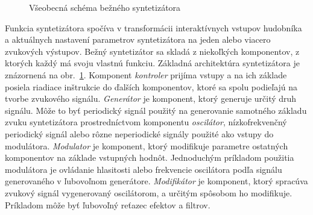 \begin{figure}[ht]
\centering
{}
\caption{\label{obr01} Všeobecná schéma bežného syntetizátora}
\end{figure}

Funkcia syntetizátora spočíva v transformácii interaktívnych vstupov hudobníka a aktuálnych nastavení parametrov syntetizátora na jeden alebo viacero zvukových výstupov. Bežný syntetizátor sa skladá z niekoľkých komponentov, z ktorých každý má svoju vlastnú funkciu. Základná architektúra syntetizátora je znázornená na  obr.~\ref{obr01}. Komponent \emph{kontroler} prijíma vstupy a na ich základe posiela riadiace inštrukcie do ďalších komponentov, ktoré sa spolu podieľajú na tvorbe zvukového signálu. \emph{Generátor} je komponent, ktorý generuje určitý druh signálu. Môže to byť periodický signál použitý na generovanie samotného základu zvuku syntetizátora prostredníctvom komponentu \emph{oscilátor}, nízkofrekvenčný periodický signál alebo rôzne neperiodické signály použité ako vstupy do modulátora. \emph{Modulator} je komponent, ktorý modifikuje parametre ostatných komponentov na základe vstupných hodnôt. Jednoduchým príkladom použitia modulátora je ovládanie hlasitosti alebo frekvencie oscilátora podľa signálu generovaného v ľubovoľnom generátore. \emph{Modifikátor} je komponent, ktorý spracúva zvukový signál vygenerovaný oscilátorom, a určitým spôsobom ho modifikuje. Príkladom môže byť ľubovoľný reťazec efektov a filtrov.

